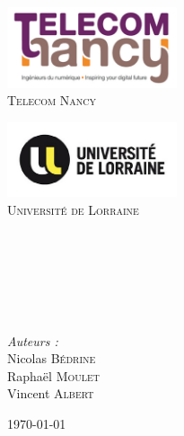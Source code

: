 
\begin{titlepage}

\begin{center}

\begin{minipage}[t]{0.48\textwidth}
  \begin{flushleft}
	\includegraphics [width=50mm]{images/logo-telecom.png} \\[0.5cm]
      \textsc{\LARGE Telecom Nancy}
  \end{flushleft}
\end{minipage}
\begin{minipage}[t]{0.48\textwidth}
  \begin{flushright}
    \includegraphics [width=50mm]{images/logo-ul.jpg} \\[0.5cm]
    \textsc{\LARGE Université de Lorraine}
  \end{flushright}
\end{minipage} \\[1.5cm]


	\textsc{\Large \reportsubject}\\[0.5cm]
	\HRule \\[0.4cm]
	{\huge \bfseries \reporttitle}\\[0.4cm]
	\HRule \\[1.5cm]
	
	\begin{minipage}[t]{0.3\textwidth}
 	 	\begin{flushleft} \large
  		\end{flushleft}
	\end{minipage}
	\begin{minipage}[t]{0.6\textwidth}
  		\begin{flushright} \large
    		\emph{Auteurs :} \\
    		Nicolas \textsc{Bédrine} \\
    		Raphaël \textsc{Moulet} \\
    		Vincent \textsc{Albert} \\
  		\end{flushright}
	\end{minipage}

\vfill

{\large \today{}}

\end{center}

\end{titlepage}
